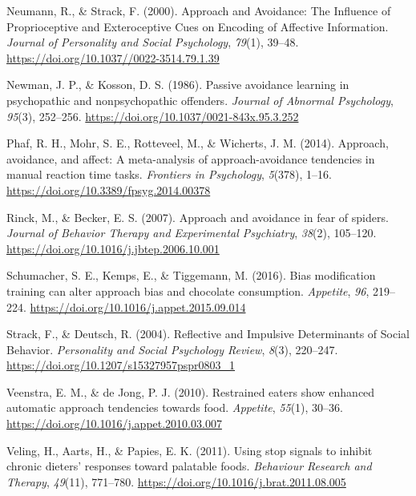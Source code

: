 \documentclass[man]{apa6}
\begin{document}
\leavevmode\hypertarget{ref-neumann_approach_2000}{}%
Neumann, R., \& Strack, F. (2000). Approach and Avoidance: The Influence of Proprioceptive and Exteroceptive Cues on Encoding of Affective Information. \emph{Journal of Personality and Social Psychology}, \emph{79}(1), 39--48. \url{https://doi.org/10.1037//0022-3514.79.1.39}

\leavevmode\hypertarget{ref-newmanPassiveAvoidanceLearning1986}{}%
Newman, J. P., \& Kosson, D. S. (1986). Passive avoidance learning in psychopathic and nonpsychopathic offenders. \emph{Journal of Abnormal Psychology}, \emph{95}(3), 252--256. \url{https://doi.org/10.1037/0021-843x.95.3.252}

\leavevmode\hypertarget{ref-phaf_approach_2014}{}%
Phaf, R. H., Mohr, S. E., Rotteveel, M., \& Wicherts, J. M. (2014). Approach, avoidance, and affect: A meta-analysis of approach-avoidance tendencies in manual reaction time tasks. \emph{Frontiers in Psychology}, \emph{5}(378), 1--16. \url{https://doi.org/10.3389/fpsyg.2014.00378}

\leavevmode\hypertarget{ref-rinck_approach_2007}{}%
Rinck, M., \& Becker, E. S. (2007). Approach and avoidance in fear of spiders. \emph{Journal of Behavior Therapy and Experimental Psychiatry}, \emph{38}(2), 105--120. \url{https://doi.org/10.1016/j.jbtep.2006.10.001}

\leavevmode\hypertarget{ref-schumacher_bias_2016}{}%
Schumacher, S. E., Kemps, E., \& Tiggemann, M. (2016). Bias modification training can alter approach bias and chocolate consumption. \emph{Appetite}, \emph{96}, 219--224. \url{https://doi.org/10.1016/j.appet.2015.09.014}

\leavevmode\hypertarget{ref-strack_reflective_2004}{}%
Strack, F., \& Deutsch, R. (2004). Reflective and Impulsive Determinants of Social Behavior. \emph{Personality and Social Psychology Review}, \emph{8}(3), 220--247. \url{https://doi.org/10.1207/s15327957pspr0803_1}

\leavevmode\hypertarget{ref-veenstra_restrained_2010}{}%
Veenstra, E. M., \& de Jong, P. J. (2010). Restrained eaters show enhanced automatic approach tendencies towards food. \emph{Appetite}, \emph{55}(1), 30--36. \url{https://doi.org/10.1016/j.appet.2010.03.007}

\leavevmode\hypertarget{ref-veling_using_2011}{}%
Veling, H., Aarts, H., \& Papies, E. K. (2011). Using stop signals to inhibit chronic dieters' responses toward palatable foods. \emph{Behaviour Research and Therapy}, \emph{49}(11), 771--780. \url{https://doi.org/10.1016/j.brat.2011.08.005}
\end{document}
